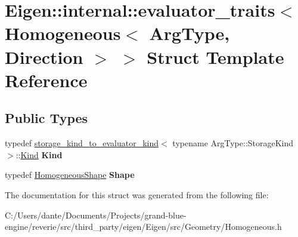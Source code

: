 \hypertarget{struct_eigen_1_1internal_1_1evaluator__traits_3_01_homogeneous_3_01_arg_type_00_01_direction_01_4_01_4}{}\section{Eigen\+::internal\+::evaluator\+\_\+traits$<$ Homogeneous$<$ Arg\+Type, Direction $>$ $>$ Struct Template Reference}
\label{struct_eigen_1_1internal_1_1evaluator__traits_3_01_homogeneous_3_01_arg_type_00_01_direction_01_4_01_4}
\subsection*{Public Types}
\begin{DoxyCompactItemize}
\item 
\mbox{\label{struct_eigen_1_1internal_1_1evaluator__traits_3_01_homogeneous_3_01_arg_type_00_01_direction_01_4_01_4_aac836b3f5b97f29042d9cf140b3617dc}} 
typedef \mbox{\hyperlink{struct_eigen_1_1internal_1_1storage__kind__to__evaluator__kind}{storage\+\_\+kind\+\_\+to\+\_\+evaluator\+\_\+kind}}$<$ typename Arg\+Type\+::\+Storage\+Kind $>$\+::\mbox{\hyperlink{struct_eigen_1_1internal_1_1_index_based}{Kind}} {\bfseries Kind}
\item 
\mbox{\label{struct_eigen_1_1internal_1_1evaluator__traits_3_01_homogeneous_3_01_arg_type_00_01_direction_01_4_01_4_ac8979d16a4c8219f556330711e3204a8}} 
typedef \mbox{\hyperlink{struct_eigen_1_1_homogeneous_shape}{Homogeneous\+Shape}} {\bfseries Shape}
\end{DoxyCompactItemize}


The documentation for this struct was generated from the following file\+:\begin{DoxyCompactItemize}
\item 
C\+:/\+Users/dante/\+Documents/\+Projects/grand-\/blue-\/engine/reverie/src/third\+\_\+party/eigen/\+Eigen/src/\+Geometry/Homogeneous.\+h\end{DoxyCompactItemize}
